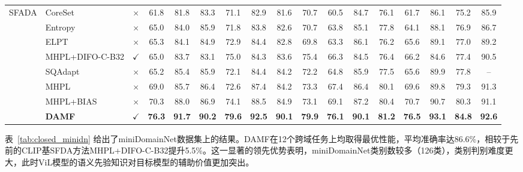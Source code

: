 \begin{table}[!htbp]
{\begin{tabular}{llccccccccccccccc}
    \midrule
    SFADA & CoreSet~\cite{prabhu2021active} & $\times$ & 61.8 & 81.8 & 83.3 & 71.1 & 82.9 & 81.6 & 70.7 & 60.5 & 84.7 & 76.1 & 61.7 & 86.1 & 75.2 & 85.9 \\
    & Entropy~\cite{wang2014new} & $\times$ & 65.0 & 84.0 & 85.9 & 71.8 & 83.8 & 82.6 & 70.7 & 63.8 & 85.1 & 77.8 & 64.1 & 88.1 & 76.9 & 86.7 \\
    & ELPT~\cite{li2022source} & $\times$ & 65.3 & 84.1 & 84.9 & 72.9 & 84.4 & 82.8 & 69.8 & 63.3 & 86.1 & 76.2 & 65.6 & 89.1 & 77.0 & 89.2 \\
    & MHPL+DIFO-C-B32 & $\checkmark$ & 65.0 & 83.7 & 83.1 & 75.0 & 84.3 & 83.6 & 75.4 & 66.3 & 84.5 & 76.4 & 66.2 & 84.6 & 77.4 & 90.5 \\
    & SQAdapt~\cite{li2023source} & $\times$ & 65.2 & 85.4 & 85.9 & 72.1 & 84.4 & 84.2 & 72.2 & 64.8 & 85.9 & 77.5 & 65.6 & 89.9 & 77.8 & -- \\
    & MHPL~\cite{wang2023mhpl} & $\times$ & 69.0 & 85.7 & 86.4 & 72.6 & 87.4 & 84.2 & 73.3 & 67.4 & 86.4 & 80.1 & 69.6 & 89.8 & 79.3 & 91.3 \\
    & MHPL+BIAS~\cite{wang2024bias} & $\times$ & 70.3 & 88.0 & 86.9 & 74.1 & 88.5 & 84.9 & 73.1 & 69.1 & 87.2 & 80.4 & 70.7 & 90.7 & 80.3 & 91.1 \\
    &\textbf{DAMF}  & $\checkmark$ & \textbf{76.3} & \textbf{91.7} & \textbf{90.2} & \textbf{79.6} & \textbf{92.5} & \textbf{90.1} & \textbf{79.9} & \textbf{76.1} & \textbf{90.1} & \textbf{81.2} & \textbf{76.5} & \textbf{93.1} & \textbf{84.8} & \textbf{92.6} \\
    \bottomrule
    \end{tabular}
    }
\end{table}

表~\ref{tab:closed_minidn} 给出了miniDomainNet数据集上的结果。DAMF在12个跨域任务上均取得最优性能，平均准确率达86.6\%，相较于先前的CLIP基SFDA方法MHPL+DIFO-C-B32提升5.5\%。这一显著的领先优势表明，miniDomainNet类别数较多（126类），类别判别难度更大，此时ViL模型的语义先验知识对目标模型的辅助价值更加突出。

